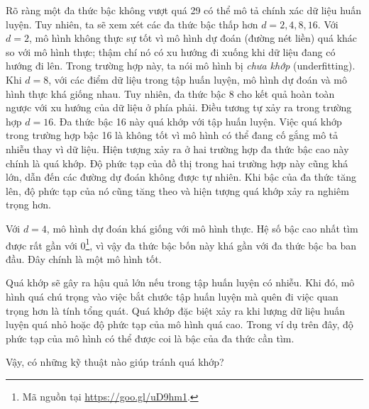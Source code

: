 Rõ ràng một đa thức bậc không vượt quá 29 có thể mô tả chính xác dữ liệu huấn
luyện. Tuy nhiên, ta sẽ xem xét các đa thức bậc thấp hơn $d = 2, 4, 8, 16$. Với
$d = 2$, mô hình không thực sự tốt vì mô hình dự đoán (đường nét liền) quá khác
so với {mô hình thực}; thậm chí nó có xu hướng đi xuống khi dữ liệu đang
có hướng đi lên. Trong trường hợp này, ta nói mô hình bị \textit{chưa khớp} (underfitting).
Khi $d = 8$, với các điểm dữ liệu trong tập huấn luyện, mô hình dự đoán và mô
hình thực khá giống nhau. Tuy nhiên, đa thức bậc 8 cho kết quả hoàn toàn ngược
với {xu hướng của dữ liệu} ở phía phải. Điều tương tự xảy ra trong trường hợp $d
= 16$. Đa thức bậc 16 này quá khớp với tập huấn luyện. Việc quá khớp
trong trường hợp bậc 16 là không tốt vì mô hình có thể đang cố gắng mô tả
{nhiễu} thay vì dữ liệu. Hiện tượng xảy ra ở hai trường hợp đa thức bậc
cao này chính là quá khớp. Độ phức tạp của đồ thị trong hai
trường hợp này cũng khá lớn, dẫn đến các đường dự đoán không được tự nhiên. Khi bậc của đa thức tăng lên, độ phức tạp của nó cũng tăng theo và hiện tượng quá khớp xảy ra nghiêm trọng hơn.


Với $d = 4$, mô hình dự đoán khá giống với mô hình thực. Hệ số bậc cao nhất tìm
được rất gần với 0\footnote{Mã nguồn tại \url{https://goo.gl/uD9hm1}.}, vì
vậy đa thức bậc bốn này khá gần với đa thức bậc ba ban đầu. Đây chính là một mô
hình tốt.


Quá khớp sẽ gây ra hậu quả lớn nếu trong tập huấn luyện có nhiễu. Khi
đó, mô hình quá chú trọng vào việc bắt chước tập huấn luyện mà quên đi việc
quan trọng hơn là tính tổng quát. Quá khớp đặc biệt xảy ra khi lượng dữ liệu huấn
luyện quá nhỏ hoặc độ phức tạp của mô hình quá cao. Trong ví dụ trên đây, độ
phức tạp của mô hình có thể được coi là bậc của đa thức cần tìm.


Vậy, có những kỹ thuật nào giúp tránh quá khớp?

